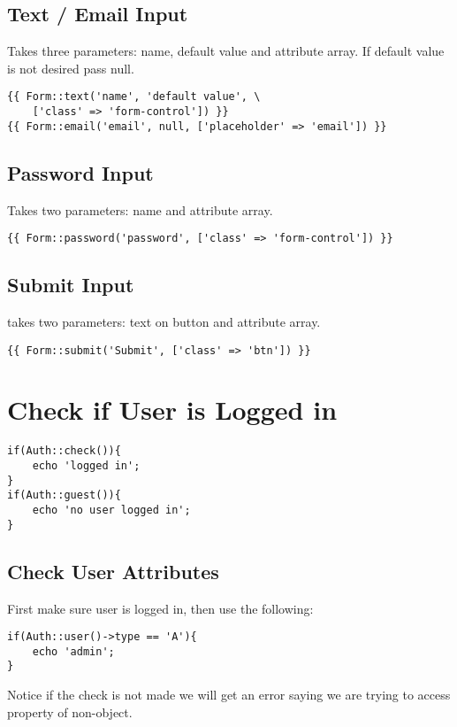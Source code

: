 \documentclass[a4paper, 10pt]{article}
\begin{document}
\subsection{Text / Email Input}
Takes three parameters: name, default value and attribute array.
If default value is not desired pass null.
\begin{verbatim}
{{ Form::text('name', 'default value', \ 
    ['class' => 'form-control']) }}
{{ Form::email('email', null, ['placeholder' => 'email']) }}
\end{verbatim}
\subsection{Password Input}
Takes two parameters: name and attribute array.
\begin{verbatim}
{{ Form::password('password', ['class' => 'form-control']) }}
\end{verbatim}
\subsection{Submit Input}
takes two parameters: text on button and attribute array.
\begin{verbatim}
{{ Form::submit('Submit', ['class' => 'btn']) }}
\end{verbatim}

\section{Check if User is Logged in}
\begin{verbatim}
if(Auth::check()){
    echo 'logged in';
}
if(Auth::guest()){
    echo 'no user logged in';
}
\end{verbatim}
\subsection{Check User Attributes}
First make sure user is logged in, then use the following:
\begin{verbatim}
if(Auth::user()->type == 'A'){
    echo 'admin';
}
\end{verbatim}
Notice if the check is not made we will get an error saying we are
trying to access property of non-object.

\end{document}
